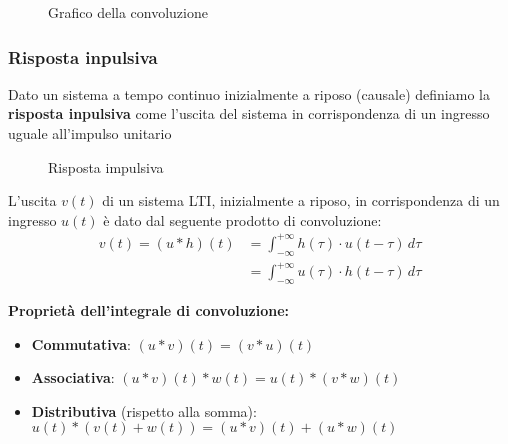 \documentclass[a4paper]{article}
\begin{document}
\begin{example}
\begin{figure}[H]
    \caption{Grafico della convoluzione}
  \end{figure}
\end{example}

\subsubsection{Risposta inpulsiva}
\begin{definition}
  Dato un sistema a tempo continuo inizialmente a riposo (causale) definiamo la 
  \textbf{risposta inpulsiva} come l'uscita del sistema in corrispondenza di un ingresso
  uguale all'impulso unitario
  \begin{figure}[H]
    \centering
    \caption{Risposta impulsiva}
  \end{figure}
\end{definition}

\begin{theorem}
  L'uscita \( v(t) \) di un sistema LTI, inizialmente a riposo, in corrispondenza di un
  ingresso \( u(t) \) è dato dal seguente prodotto di convoluzione:
  \[
    \begin{aligned}
      v(t) = (u \ast h)(t) &= \int_{-\infty}^{+\infty} h(\tau) \cdot u(t-\tau) \, d\tau\\
                           &= \int_{-\infty}^{+\infty} u(\tau) \cdot h(t-\tau) \, d\tau
    \end{aligned}
  \] 
\end{theorem}

\noindent
\textbf{Proprietà dell'integrale di convoluzione:}
\begin{itemize}
  \item \textbf{Commutativa}: \( (u \ast v)(t) = (v \ast u)(t) \) 
  \item \textbf{Associativa}: \( (u \ast v)(t) \ast w(t) = u(t) \ast (v \ast w)(t) \)
  \item \textbf{Distributiva} (rispetto alla somma): \( u(t) \ast (v(t) + w(t)) = (u \ast v)(t) + (u \ast w)(t) \)
\end{itemize}
\end{document}
